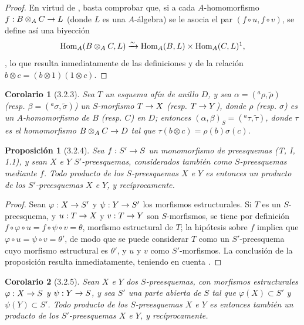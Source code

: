 \documentclass[oneside]{amsart}
\theoremstyle{ega-env-style}
\theoremstyle{ega-thm-env-style}
\newtheorem*{proposition}{Proposición}
\newtheorem*{corollary}{Corolario}
\theoremstyle{ega-defn-env-style}
\renewcommand{\to}{\mathchoice{\longrightarrow}{\rightarrow}{\rightarrow}{\rightarrow}}
\let\EGAOriginalLabel\label
\renewcommand{\label}[1]{\phantomsection\EGAOriginalLabel{#1}}
\begin{document}
\begin{proof}
En virtud de , basta comprobar que, si a cada $A$-homomorfismo
$f:B\otimes_A C\to L$ (donde $L$ es una $A$-álgebra) se le asocia el par
$(f\circ u,f\circ v)$, se define así una biyección
\[
  \operatorname{Hom}_A(B\otimes_A C,L)\xrightarrow{\sim}
  \operatorname{Hom}_A(B,L)\times\operatorname{Hom}_A(C,L)\footnotemark,
\]
, lo que resulta inmediatamente
de las definiciones y de la relación $b\otimes c=(b\otimes1)(1\otimes c)$.
\end{proof}

\begin{corollary}[3.2.3]
\label{I.3.2.3}
Sea $T$ un esquema afín de anillo $D$, y sea $\alpha=({}^a\rho,\widetilde{\rho})$
\textup{(resp. $\beta=({}^a\sigma,\widetilde{\sigma})$)} un $S$-morfismo $T\to X$ \textup{(resp. $T\to Y$)},
donde $\rho$ \textup{(resp. $\sigma$)} es un $A$-homomorfismo de $B$ \textup{(resp. $C$)} en $D$; entonces
$(\alpha,\beta)_S=({}^a\tau,\widetilde{\tau})$, donde $\tau$ es el homomorfismo
$B\otimes_A C\to D$ tal que $\tau(b\otimes c)=\rho(b)\sigma(c)$.
\end{corollary}

\begin{proposition}[3.2.4]
\label{I.3.2.4}
Sea $f:S'\to S$ un \textup{monomorfismo} de preesquemas \textup{(T, I, 1.1)}, y sean $X$ e $Y$
$S'$-preesquemas, considerados también como $S$-preesquemas mediante $f$. Todo producto de
los $S$-preesquemas $X$ e $Y$ es entonces un producto de los $S'$-preesquemas $X$ e $Y$, y recíprocamente.
\end{proposition}

\begin{proof}
Sean $\varphi:X\to S'$ y $\psi:Y\to S'$ los morfismos estructurales. Si $T$ es un $S$-preesquema, y
$u:T\to X$ y $v:T\to Y$ son $S$-morfismos, se tiene por definición
$f\circ\varphi\circ u=f\circ\psi\circ v=\theta$, morfismo estructural de $T$; la hipótesis
sobre $f$ implica que $\varphi\circ u=\psi\circ v=\theta'$, de modo que se puede considerar $T$ como un
$S'$-preesquema cuyo morfismo estructural es $\theta'$, y $u$ y $v$ como $S'$-morfismos. La
conclusión de la proposición resulta inmediatamente, teniendo en cuenta .
\end{proof}

\begin{corollary}[3.2.5]
\label{I.3.2.5}
Sean $X$ e $Y$ dos $S$-preesquemas, con morfismos estructurales $\varphi:X\to S$ y $\psi:Y\to S$, y sea
$S'$ una parte abierta de $S$ tal que $\varphi(X)\subset S'$ y $\psi(Y)\subset S'$. Todo producto
de los $S$-preesquemas $X$ e $Y$ es entonces también un producto de los $S'$-preesquemas $X$ e $Y$, y
recíprocamente.
\end{corollary}
\end{document}
